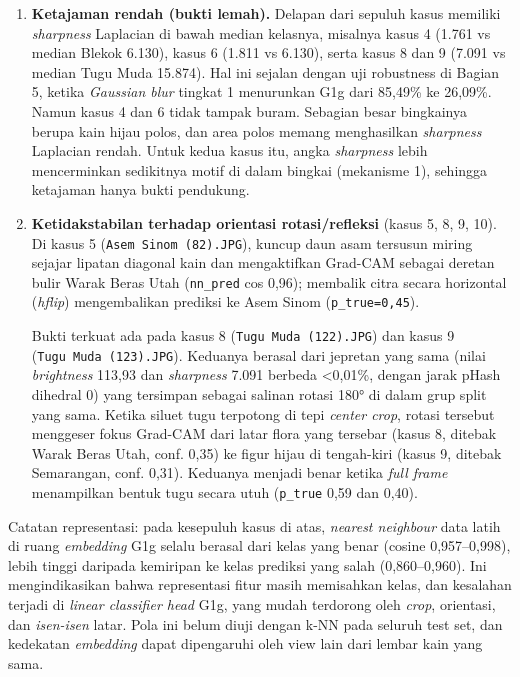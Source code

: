 \documentclass[10pt,a4paper]{article}
\begin{document}
\begin{enumerate}
\def\labelenumi{\arabic{enumi}.}
\setcounter{enumi}{2}
\item
  \textbf{Ketajaman rendah (bukti lemah).} Delapan dari sepuluh kasus memiliki \emph{sharpness}
  Laplacian di bawah median kelasnya, misalnya kasus 4 (1.761 vs median Blekok 6.130),
  kasus 6 (1.811 vs 6.130), serta kasus 8 dan 9 (7.091 vs median Tugu Muda 15.874). Hal ini
  sejalan dengan uji robustness di Bagian 5, ketika \emph{Gaussian blur} tingkat 1 menurunkan
  G1g dari 85,49\% ke 26,09\%. Namun kasus 4 dan 6 tidak tampak buram. Sebagian besar
  bingkainya berupa kain hijau polos, dan area polos memang menghasilkan \emph{sharpness}
  Laplacian rendah. Untuk kedua kasus itu, angka \emph{sharpness} lebih mencerminkan sedikitnya motif di
  dalam bingkai (mekanisme 1), sehingga ketajaman hanya bukti pendukung.
\item
  \textbf{Ketidakstabilan terhadap orientasi rotasi/refleksi} (kasus 5, 8, 9, 10).
  Di kasus 5 (\texttt{Asem\ Sinom\ (82).JPG}), kuncup daun asam tersusun miring sejajar
  lipatan diagonal kain dan mengaktifkan Grad-CAM sebagai deretan bulir Warak Beras
  Utah (\texttt{nn\_\allowbreak{}pred} cos 0,96); membalik citra secara horizontal (\emph{hflip}) mengembalikan
  prediksi ke Asem Sinom (\texttt{p\_\allowbreak{}true=0,\allowbreak{}45}).

  Bukti terkuat ada pada kasus 8 (\texttt{Tugu\ Muda\ (122).JPG}) dan kasus 9
  (\texttt{Tugu\ Muda\ (123).JPG}). Keduanya berasal dari jepretan yang sama (nilai \emph{brightness}
  113,93 dan \emph{sharpness} 7.091 berbeda \textless0,01\%, dengan jarak pHash dihedral 0) yang
  tersimpan sebagai salinan rotasi 180° di dalam grup split yang sama. Ketika siluet
  tugu terpotong di tepi \emph{center crop}, rotasi tersebut menggeser fokus Grad-CAM dari
  latar flora yang tersebar (kasus 8, ditebak Warak Beras Utah, conf. 0,35) ke figur
  hijau di tengah-kiri (kasus 9, ditebak Semarangan, conf. 0,31). Keduanya menjadi benar
  ketika \emph{full frame} menampilkan bentuk tugu secara utuh (\texttt{p\_\allowbreak{}true} 0,59 dan 0,40).
\end{enumerate}

Catatan representasi: pada kesepuluh kasus di atas, \emph{nearest neighbour} data latih di
ruang \emph{embedding} G1g selalu berasal dari kelas yang benar (cosine 0,957--0,998),
lebih tinggi daripada kemiripan ke kelas prediksi yang salah (0,860--0,960). Ini mengindikasikan
bahwa representasi fitur masih memisahkan kelas, dan kesalahan terjadi di \emph{linear classifier head}
G1g, yang mudah terdorong oleh \emph{crop}, orientasi, dan \emph{isen-isen} latar. Pola ini belum diuji
dengan k-NN pada seluruh test set, dan kedekatan \emph{embedding} dapat dipengaruhi oleh view lain
dari lembar kain yang sama.
\end{document}
